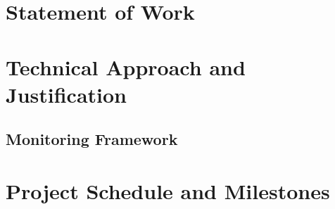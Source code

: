 \documentclass[12pt]{article}
\begin{document}
\section{Statement of Work}



\section{Technical Approach and Justification}







\subsection{Monitoring Framework}









\section{Project Schedule and Milestones}
\end{document}
